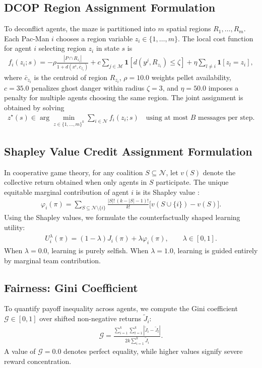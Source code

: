 \documentclass{article}
\newcommand{\ind}{\mathbf{1}}
\newcommand{\N}{\mathcal{N}}
\newcommand{\M}{\mathcal{M}}
\begin{document}
\subsection{DCOP Region Assignment Formulation}
To deconflict agents, the maze is partitioned into $m$ spatial regions $R_1, \ldots, R_m$. Each Pac-Man $i$ chooses a region variable $z_i \in \{1, \ldots, m\}$. The local cost function for agent $i$ selecting region $z_i$ in state $s$ is
\begin{align}
f_i(z_i; s) = -\rho \frac{|P \cap R_{z_i}|}{1 + d(x^i, \bar{c}_{z_i})} + c \sum_{j\in\M} \ind\left[ d(y^j, R_{z_i}) \leq \zeta \right] + \eta \sum_{l \neq i} \ind[z_l = z_i],
\label{eq:dcopcost}
\end{align}
where $\bar{c}_{z_i}$ is the centroid of region $R_{z_i}$, $\rho = 10.0$ weights pellet availability, $c = 35.0$ penalizes ghost danger within radius $\zeta = 3$, and $\eta = 50.0$ imposes a penalty for multiple agents choosing the same region. The joint assignment is obtained by solving
\begin{align}
z^\star(s) \in \arg\min_{z \in \{1, \ldots, m\}^k} \sum_{i\in\N} f_i(z_i; s) \quad \text{using at most } B \text{ messages per step}.
\label{eq:dcop}
\end{align}

\subsection{Shapley Value Credit Assignment Formulation}
In cooperative game theory, for any coalition $S \subseteq \N$, let $v(S)$ denote the collective return obtained when only agents in $S$ participate. The unique equitable marginal contribution of agent $i$ is its Shapley value \cite{shapley1953value}:
\begin{align}
\varphi_i(\pi) = \sum_{S \subseteq \N \setminus \{i\}} \frac{|S|!\,(k - |S| - 1)!}{k!} \Big[ v(S \cup \{i\}) - v(S) \Big].
\label{eq:shapley}
\end{align}
Using the Shapley values, we formulate the counterfactually shaped learning utility:
\begin{align}
U_i^\lambda(\pi) = (1 - \lambda) J_i(\pi) + \lambda \varphi_i(\pi), \qquad \lambda \in [0, 1].
\label{eq:shaped}
\end{align}
When $\lambda = 0.0$, learning is purely selfish. When $\lambda = 1.0$, learning is guided entirely by marginal team contribution.

\subsection{Fairness: Gini Coefficient}
To quantify payoff inequality across agents, we compute the Gini coefficient $\mathcal{G} \in [0, 1]$ over shifted non-negative returns $\tilde{J}_i$:
\begin{align}
\mathcal{G} = \frac{\sum_{i=1}^k \sum_{l=1}^k |\tilde{J}_i - \tilde{J}_l|}{2k \sum_{i=1}^k \tilde{J}_i}.
\label{eq:gini}
\end{align}
A value of $\mathcal{G} = 0.0$ denotes perfect equality, while higher values signify severe reward concentration.
\end{document}
